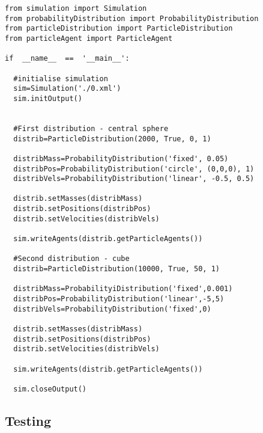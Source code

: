 \documentclass[11pt,a4paper]{article}
\begin{document}
\begin{lstlisting}
from simulation import Simulation
from probabilityDistribution import ProbabilityDistribution
from particleDistribution import ParticleDistribution
from particleAgent import ParticleAgent

if  __name__  ==  '__main__':

  #initialise simulation
  sim=Simulation('./0.xml')
  sim.initOutput()


  #First distribution - central sphere
  distrib=ParticleDistribution(2000, True, 0, 1)
  
  distribMass=ProbabilityDistribution('fixed', 0.05)
  distribPos=ProbabilityDistribution('circle', (0,0,0), 1)
  distribVels=ProbabilityDistribution('linear', -0.5, 0.5)

  distrib.setMasses(distribMass)
  distrib.setPositions(distribPos)
  distrib.setVelocities(distribVels) 

  sim.writeAgents(distrib.getParticleAgents())

  #Second distribution - cube
  distrib=ParticleDistribution(10000, True, 50, 1)

  distribMass=ProbabilityiDistribution('fixed',0.001)
  distribPos=ProbabilityDistribution('linear',-5,5)
  distribVels=ProbabilityDistribution('fixed',0)

  distrib.setMasses(distribMass)
  distrib.setPositions(distribPos)
  distrib.setVelocities(distribVels) 

  sim.writeAgents(distrib.getParticleAgents())

  sim.closeOutput()

\end{lstlisting}

\subsection{Testing}
\end{document}
